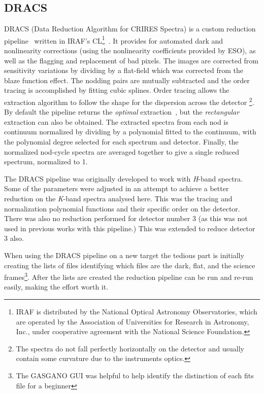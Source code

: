 \subsection{{DRACS}}
\label{subsec:dracs}
{DRACS} (Data Reduction Algorithm for {CRIRES} Spectra) is a custom reduction pipeline~\citep{figueira_radial_2010} written in {IRAF}'s CL\footnote{{IRAF} is distributed by the National Optical Astronomy Observatories, which are operated by the Association of Universities for Research in Astronomy, {Inc.}, under cooperative agreement with the National Science Foundation.}~\citep{tody_iraf_1993}. It provides for automated dark and nonlinearity corrections (using the nonlinearity coefficients provided by {ESO}), as well as the flagging and replacement of bad pixels. The images are corrected from sensitivity variations by dividing by a flat-field which was corrected from the blaze function effect. The nodding pairs are mutually subtracted and the order tracing is accomplished by fitting cubic splines. Order tracing allows the extraction algorithm to follow the shape for the dispersion across the detector \footnote{The spectra do not fall perfectly horizontally on the detector and usually contain some curvature due to the instruments optics.}.
By default the pipeline returns the \emph{optimal} extraction~\citep{horne_optimal_1986}, but the \emph{rectangular} extraction can also be obtained. The extracted spectra from each nod is continuum normalized by dividing by a polynomial fitted to the continuum, with the polynomial degree selected for each spectrum and detector. Finally, the normalized nod-cycle spectra are averaged together to give a single reduced spectrum, normalized to 1.

The {DRACS} pipeline was originally developed to work with \emph{H}-band spectra. Some of the parameters were adjusted in an attempt to achieve a better reduction on the \emph{K}-band spectra analysed here. This was the tracing and normalization polynomial functions and their specific order on the detector. There was also no reduction performed for detector number 3 (as this was not used in previous works with this pipeline.) This was extended to reduce detector 3 also.

When using the {DRACS} pipeline on a new target the tedious part is initially creating the lists of files identifying which files are the dark, flat, and the science frames\footnote{The GASGANO GUI was helpful to help identify the distinction of each fits file for a beginner}. After the lists are created the reduction pipeline can be run and re-run easily, making the effort worth it.

